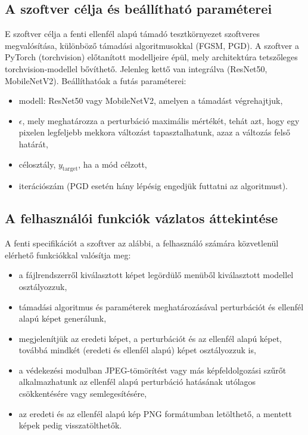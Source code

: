 \subsection{A szoftver célja és beállítható paraméterei}
E szoftver célja a fenti ellenfél alapú támadó tesztkörnyezet szoftveres megvalósítása, különböző támadási algoritmusokkal 
(FGSM, PGD). 
A szoftver a PyTorch (torchvision) előtanított modelljeire épül, mely architektúra tetszőleges torchvision-modellel bővíthető. 
Jelenleg kettő van integrálva (ResNet50, MobileNetV2). 
Beállíthatóak a futás paraméterei: 
\begin{itemize}
  \item modell: ResNet50 vagy MobileNetV2, amelyen a támadást végrehajtjuk, 
  \item $\epsilon$, mely meghatározza a perturbáció maximális mértékét, tehát azt, hogy egy pixelen legfeljebb mekkora változást 
        tapasztalhatunk, azaz a változás felső határát, 
  \item célosztály, $y_{\mathrm{target}}$, ha a mód célzott, 
  \item iterációszám (PGD esetén hány lépésig engedjük futtatni az algoritmust). 
\end{itemize}

\subsection{A felhasználói funkciók vázlatos áttekintése}

A fenti specifikációt a szoftver az alábbi, a felhasználó számára közvetlenül elérhető funkciókkal valósítja meg: 
\begin{itemize}
  \item a fájlrendszerről kiválasztott képet legördülő menüből kiválasztott modellel osztályozzuk, 
  \item támadási algoritmus és paraméterek meghatározásával perturbációt és ellenfél alapú képet generálunk, 
  \item megjelenítjük az eredeti képet, a perturbációt és az ellenfél alapú képet, továbbá mindkét (eredeti és ellenfél alapú) 
        képet osztályozzuk is, 
  \item a védekezési modulban JPEG-tömörítést vagy más képfeldolgozási szűrőt alkalmazhatunk az ellenfél alapú perturbáció 
        hatásának utólagos csökkentésére vagy semlegesítésére, 
  \item az eredeti és az ellenfél alapú kép PNG formátumban letölthető, a mentett képek pedig visszatölthetők. 
\end{itemize}

